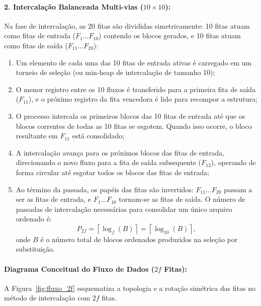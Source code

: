 \documentclass[12pt,a4paper]{article}
\begin{document}
\paragraph{2. Intercalação Balanceada Multi-vias ($10 \times 10$):}
Na fase de intercalação, as 20 fitas são divididas simetricamente: 10 fitas atuam como fitas de entrada ($F_1 \dots F_{10}$) contendo os blocos gerados, e 10 fitas atuam como fitas de saída ($F_{11} \dots F_{20}$):
\begin{enumerate}
    \item Um elemento de cada uma das 10 fitas de entrada ativas é carregado em um torneio de seleção (ou min-heap de intercalação de tamanho 10);
    \item O menor registro entre os 10 fluxos é transferido para a primeira fita de saída ($F_{11}$), e o próximo registro da fita vencedora é lido para recompor a estrutura;
    \item O processo intercala os primeiros blocos das 10 fitas de entrada até que os blocos correntes de todas as 10 fitas se esgotem. Quando isso ocorre, o bloco resultante em $F_{11}$ está consolidado;
    \item A intercalação avança para os próximos blocos das fitas de entrada, direcionando o novo fluxo para a fita de saída subsequente ($F_{12}$), operando de forma circular até esgotar todos os blocos das fitas de entrada;
    \item Ao término da passada, os papéis das fitas são invertidos: $F_{11} \dots F_{20}$ passam a ser as fitas de entrada, e $F_1 \dots F_{10}$ tornam-se as fitas de saída. O número de passadas de intercalação necessárias para consolidar um único arquivo ordenado é:
    \begin{equation}
        P_{2f} = \left\lceil \log_{f} (B) \right\rceil = \left\lceil \log_{10} (B) \right\rceil,
    \end{equation}
    onde $B$ é o número total de blocos ordenados produzidos na seleção por substituição.
\end{enumerate}

\paragraph{Diagrama Conceitual do Fluxo de Dados ($2f$ Fitas):}
A Figura~\ref{fig:fluxo_2f} esquematiza a topologia e a rotação simétrica das fitas no método de intercalação com $2f$ fitas.
\end{document}
